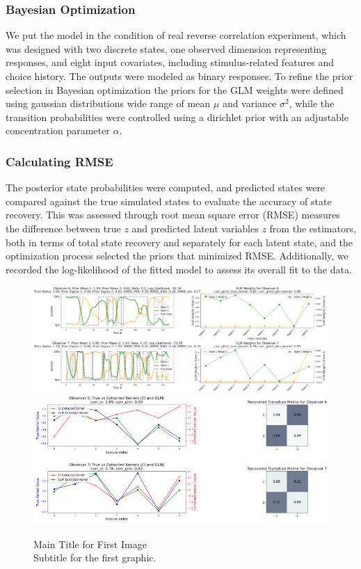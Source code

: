\subsubsection{Bayesian Optimization}
We put the model in the condition of real reverse correlation experiment, which was designed with two discrete states, one observed dimension representing responses, and eight input covariates, including stimulus-related features and choice history. The outputs were modeled as binary responses. To refine the prior selection in Bayesian optimization the priors for the GLM weights were defined using gaussian distributions wide range of mean $\mu$ and variance $\sigma^2$, while the transition probabilities were controlled using a dirichlet prior with an adjustable concentration parameter $\alpha$.
\subsubsection{Calculating RMSE}
The posterior state probabilities were computed, and predicted states were compared against the true simulated states to evaluate the accuracy of state recovery. This was assessed through root mean square error (RMSE) measures the difference between true $z$ and predicted latent variables $z$ from the estimators, both in terms of total state recovery and separately for each latent state, and the optimization process selected the priors that minimized RMSE. Additionally, we recorded the log-likelihood of the fitted model to assess its overall fit to the data.
\begin{figure}[H]
    \centering
    \includegraphics[width=16cm]{MainLayout/Images/chapter7/bo_glmhmm.png}
    \includegraphics[width=16cm]{MainLayout/Images/chapter7/bo_glmhmm1.png}
    \caption{Main Title for First Image \\ \small Subtitle for the first graphic.}
    \label{fig:patient_responses}
\end{figure}
